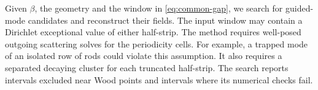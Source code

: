 Given $\beta$, the geometry and the window in \eqref{eq:common-gap}, we
search for guided-mode candidates and reconstruct their fields. The input
window may contain a Dirichlet exceptional value of either half-strip.
The method requires well-posed outgoing scattering solves for the
periodicity cells. For example, a trapped mode of an isolated row of rods
could violate this assumption. It also requires a separated decaying
cluster for each truncated half-strip. The search reports intervals
excluded near Wood points and intervals where its numerical checks fail.
